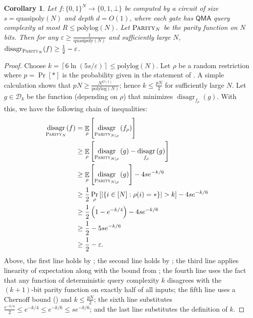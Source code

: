 \documentclass[11pt]{article}%
\newtheorem{corollary}[theorem]{Corollary}
\newcommand{\eps}{\varepsilon}
\newcommand{\E}{\mathop{\mathbb{E}}}
\newcommand{\polylog}{\mathrm{polylog}}
\newcommand{\quasipoly}{\mathrm{quasipoly}}
\newcommand{\PARITY}{\normalfont\textsc{Parity}}
\DeclareMathOperator{\disagr}{\mathrm{disagr}}
\begin{document}
\begin{corollary}
\label{cor:qmah_parity_disagreement}
Let $f: \{0,1\}^N \to \{0,1,\bot\}$ be computed by a circuit of size $s = \quasipoly(N)$ and depth $d = O(1)$, where each gate has $\mathsf{QMA}$ query complexity at most $R \le \polylog(N)$. Let $\PARITY_N$ be the parity function on $N$ bits. Then for any $\eps \ge \frac{1}{\quasipoly(N)}$ and sufficiently large $N$, $\disagr_{\PARITY_N}(f) \ge \frac{1}{2} - \eps$.
\end{corollary}
\begin{proof}
Choose $k = \left\lceil 6\ln\left(5s/\eps\right)\right\rceil \le \polylog(N)$. Let $\rho$ be a random restriction where $p = \Pr[*]$ is the probability given in the statement of . A simple calculation shows that $pN \ge \frac{N^{\Omega(1)}}{\polylog(N)}$; hence $k \le \frac{pN}{2}$ for sufficiently large $N$. Let $g \in \mathcal{D}_k$ be the function (depending on $\rho$) that minimizes $\disagr_{f_\rho}(g)$. With this, we have the following chain of inequalities:
\begin{align*}
\disagr_{\PARITY_N}(f)
&= \E_\rho\left[\disagr_{\PARITY_{N|\rho}}\left(f_\rho\right)\right]\\
&\ge \E_\rho\left[\disagr_{\PARITY_{N|\rho}}\left(g\right) - \disagr_{f_\rho}\left(g\right)\right]\\
&\ge \E_\rho\left[\disagr_{\PARITY_{N|\rho}}\left(g\right)\right] - 4se^{-k/6}\\
&\ge \frac{1}{2}\Pr_\rho\left[|\{i \in [N]: \rho(i) = *\}| > k\right] - 4se^{-k/6}\\
&\ge \frac{1}{2}\left(1 - e^{-k/4}\right) - 4se^{-k/6}\\
&\ge \frac{1}{2} - 5se^{-k/6}\\
&\ge \frac{1}{2} - \eps.
\end{align*}
Above, the first line holds by ; the second line holds by ; the third line applies linearity of expectation along with the bound from ; the fourth line uses the fact that any function of deterministic query complexity $k$ disagrees with the $(k+1)$-bit parity function on exactly half of all inputs; the fifth line uses a Chernoff bound () and $k \le \frac{pN}{2}$; the sixth line substitutes $\frac{e^{-k/4}}{2} \le e^{-k/4} \le e^{-k/6} \le se^{-k/6}$; and the last line substitutes the definition of $k$.
\end{proof}
\end{document}
